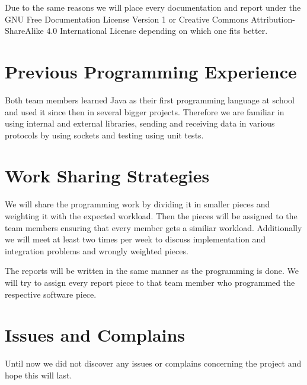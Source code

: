 \documentclass{article}
\begin{document}
Due to the same reasons we will place every documentation and report under the
GNU Free Documentation License Version 1 or Creative Commons
Attribution-ShareAlike 4.0 International License depending on which one fits
better.

\section{Previous Programming Experience} 
Both team members learned Java as their first programming language at school and
used it since then in several bigger projects. Therefore we are familiar in
using internal and external libraries, sending and receiving data in various
protocols by using sockets and testing using unit tests.

\section{Work Sharing Strategies}
We will share the programming work by dividing it in smaller pieces and
weighting it with the expected workload. Then the pieces will be assigned to
the team members ensuring that every member gets a similiar workload.
Additionally we will meet at least two times per week to discuss implementation
and integration problems and wrongly weighted pieces.

The reports will be written in the same manner as the programming is done. We
will try to assign every report piece to that team member who programmed the
respective software piece.

\section{Issues and Complains}
Until now we did not discover any issues or complains concerning the project
and hope this will last.
\end{document}
